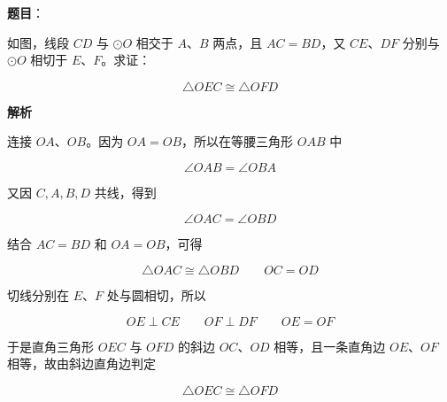 \begin{answer}

\textbf{题目}：

如图，线段 $CD$ 与 $\odot O$ 相交于 $A\text{、}B$ 两点，且 $AC=BD$，又 $CE\text{、}DF$ 分别与 $\odot O$ 相切于 $E\text{、}F$。求证：

\nopagebreak[4]
\[
\triangle OEC\cong\triangle OFD
\]
\nopagebreak[4]
\begin{center}\end{center}
\nopagebreak[4]
\textbf{解析}

连接 $OA\text{、}OB$。因为 $OA=OB$，所以在等腰三角形 $OAB$ 中

\nopagebreak[4]
\[
\angle OAB=\angle OBA
\]

又因 $C,A,B,D$ 共线，得到

\nopagebreak[4]
\[
\angle OAC=\angle OBD
\]

结合 $AC=BD$ 和 $OA=OB$，可得

\nopagebreak[4]
\[
\triangle OAC\cong\triangle OBD
\qquad OC=OD
\]

切线分别在 $E\text{、}F$ 处与圆相切，所以

\nopagebreak[4]
\[
OE\perp CE\qquad OF\perp DF\qquad OE=OF
\]

于是直角三角形 $OEC$ 与 $OFD$ 的斜边 $OC\text{、}OD$ 相等，且一条直角边 $OE\text{、}OF$ 相等，故由斜边直角边判定

\nopagebreak[4]
\[
\triangle OEC\cong\triangle OFD
\]


\end{answer}

